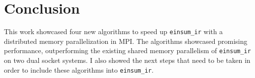 \section{Conclusion}

This work showcased four new algorithms to speed up \texttt{einsum\_ir} with a distributed memory parallelization in MPI.
The algorithms showcased promising performance, outperforming the existing shared memory parallelism of \texttt{einsum\_ir} on two dual socket systems.
I also showed the next steps that need to be taken in order to include these algorithms into \texttt{einsum\_ir}.
